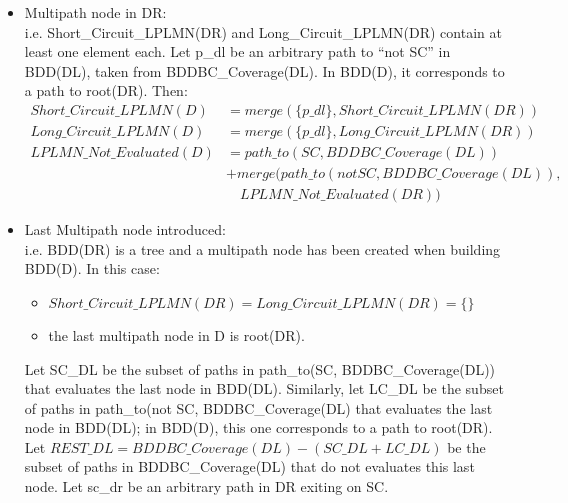 \documentclass[a4paper,12pt,twoside]{article}
\begin{document}
\begin{description}
\begin{itemize}
  \item Multipath node in DR:\\
    i.e. Short\_Circuit\_LPLMN(DR) and Long\_Circuit\_LPLMN(DR) contain
    at least one element each.
    Let p\_dl be an arbitrary path to ``not SC'' in BDD(DL), taken from
    BDDBC\_Coverage(DL). In BDD(D), it corresponds to a path to root(DR).
    Then:
    \begin{align*}
    Short\_Circuit\_LPLMN(D) & = merge(\{p\_dl\}, Short\_Circuit\_LPLMN(DR))\\
    Long\_Circuit\_LPLMN(D)  & = merge(\{p\_dl\}, Long\_Circuit\_LPLMN(DR))\\
    LPLMN\_Not\_Evaluated(D) & = path\_to(SC, BDDBC\_Coverage(DL))\\
                          & + merge(path\_to(not SC, BDDBC\_Coverage(DL)),\\
                          & \quad  LPLMN\_Not\_Evaluated(DR))
    \end{align*}

  \item Last Multipath node introduced:\\
    i.e. BDD(DR) is a tree and a multipath node has been created when building
    BDD(D). In this case:
    \begin{itemize}
    \item $Short\_Circuit\_LPLMN(DR) = Long\_Circuit\_LPLMN(DR) = \{\}$
    \item the last multipath node in D is root(DR).
    \end{itemize}

    Let SC\_DL be the subset of paths in path\_to(SC,
    BDDBC\_Coverage(DL)) that evaluates the last node in BDD(DL).
    Similarly, let LC\_DL be the subset of paths in path\_to(not SC,
    BDDBC\_Coverage(DL) that evaluates the last node in BDD(DL); in
    BDD(D), this one corresponds to a path to root(DR).  Let $REST\_DL
    = BDDBC\_Coverage(DL) - (SC\_DL + LC\_DL)$ be the subset of paths
    in BDDBC\_Coverage(DL) that do not evaluates this last node.  Let
    sc\_dr be an arbitrary path in DR exiting on SC.


\end{itemize}
\end{description}
\end{document}
